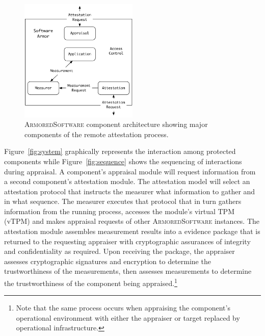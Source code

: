\documentclass[10pt]{article}
\begin{document}
\begin{figure}
  \centering
  \includegraphics[width=0.5\textwidth]{figures/architecture.pdf}
  \caption{\textsc{ArmoredSoftware} component architecture showing
    major components of the remote attestation process.}
  \label{fig:architecture}
\end{figure}

Figure~\ref{fig:system} graphically represents the interaction among
protected components while Figure~\ref{fig:sequence} shows the
sequencing of interactions during appraisal.  A component's appraisal
module will request information from a second component's attestation
module.  The attestation model will select an attestation protocol
that instructs the measurer what information to gather and in what
sequence.  The measurer executes that protocol that in turn gathers
information from the running process, accesses the module's virtual
TPM (vTPM) and makes appraisal requests of other
\textsc{ArmoredSoftware} instances.  The attestation module assembles
measurement results into a evidence package that is returned to the
requesting appraiser with cryptographic assurances of integrity and
confidentiality as required.  Upon receiving the package, the
appraiser assesses cryptographic signatures and encryption to
determine the trustworthiness of the measurements, then assesses
measurements to determine the trustworthiness of the component being
appraised.\footnote{Note that the same process occurs when appraising
  the component's operational environment with either the appraiser or
  target replaced by operational infrastructure.}
\end{document}

